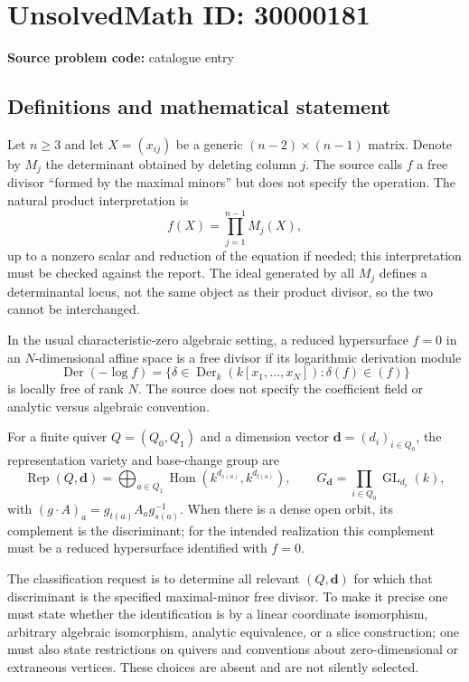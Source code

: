 \documentclass[11pt]{article}
\begin{document}
\section*{UnsolvedMath ID: 30000181}
\textbf{Source problem code:} catalogue entry
\subsection{Definitions and mathematical statement}
Let $n\geq3$ and let $X=(x_{ij})$ be a generic $(n-2)\times(n-1)$ matrix. Denote by $M_j$ the determinant obtained by deleting column $j$. The source calls $f$ a free divisor ``formed by the maximal minors'' but does not specify the operation. The natural product interpretation is
\[
 f(X)=\prod_{j=1}^{n-1}M_j(X),
\]
up to a nonzero scalar and reduction of the equation if needed; this interpretation must be checked against the report. The ideal generated by all $M_j$ defines a determinantal locus, not the same object as their product divisor, so the two cannot be interchanged.

In the usual characteristic-zero algebraic setting, a reduced hypersurface $f=0$ in an $N$-dimensional affine space is a free divisor if its logarithmic derivation module
\[
 \operatorname{Der}(-\log f)=\{\delta\in\operatorname{Der}_k(k[x_1,\ldots,x_N]):
                                    \delta(f)\in(f)\}
\]
is locally free of rank $N$. The source does not specify the coefficient field or analytic versus algebraic convention.

For a finite quiver $Q=(Q_0,Q_1)$ and a dimension vector $\mathbf d=(d_i)_{i\in Q_0}$, the representation variety and base-change group are
\[
 \operatorname{Rep}(Q,\mathbf d)=
 \bigoplus_{a\in Q_1}\operatorname{Hom}(k^{d_{s(a)}},k^{d_{t(a)}}),
 \qquad G_{\mathbf d}=\prod_{i\in Q_0}\operatorname{GL}_{d_i}(k),
\]
with $(g\cdot A)_a=g_{t(a)}A_ag_{s(a)}^{-1}$. When there is a dense open orbit, its complement is the discriminant; for the intended realization this complement must be a reduced hypersurface identified with $f=0$.

The classification request is to determine all relevant $(Q,\mathbf d)$ for which that discriminant is the specified maximal-minor free divisor. To make it precise one must state whether the identification is by a linear coordinate isomorphism, arbitrary algebraic isomorphism, analytic equivalence, or a slice construction; one must also state restrictions on quivers and conventions about zero-dimensional or extraneous vertices. These choices are absent and are not silently selected.
\end{document}
